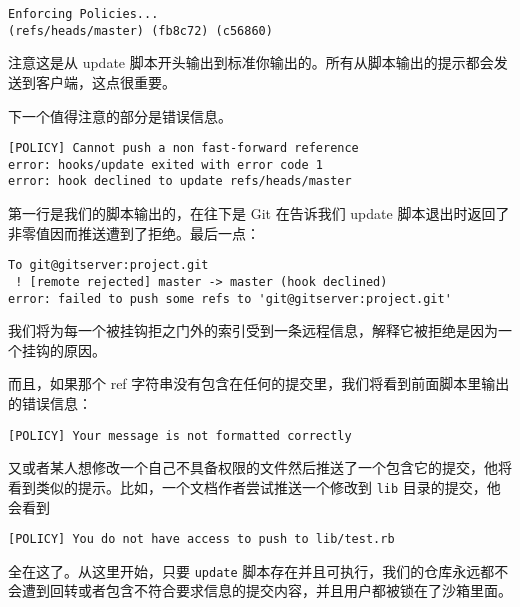 \documentclass[a4paper]{book}
\begin{document}
\begin{shaded}\begin{verbatim}
Enforcing Policies... 
(refs/heads/master) (fb8c72) (c56860)
\end{verbatim}\end{shaded}

注意这是从 update 脚本开头输出到标准你输出的。所有从脚本输出的提示都会发送到客户端，这点很重要。

下一个值得注意的部分是错误信息。

\begin{shaded}\begin{verbatim}
[POLICY] Cannot push a non fast-forward reference
error: hooks/update exited with error code 1
error: hook declined to update refs/heads/master
\end{verbatim}\end{shaded}

第一行是我们的脚本输出的，在往下是 Git 在告诉我们 update 脚本退出时返回了非零值因而推送遭到了拒绝。最后一点：

\begin{shaded}\begin{verbatim}
To git@gitserver:project.git
 ! [remote rejected] master -> master (hook declined)
error: failed to push some refs to 'git@gitserver:project.git'
\end{verbatim}\end{shaded}

我们将为每一个被挂钩拒之门外的索引受到一条远程信息，解释它被拒绝是因为一个挂钩的原因。

而且，如果那个 ref 字符串没有包含在任何的提交里，我们将看到前面脚本里输出的错误信息：

\begin{shaded}\begin{verbatim}
[POLICY] Your message is not formatted correctly
\end{verbatim}\end{shaded}

又或者某人想修改一个自己不具备权限的文件然后推送了一个包含它的提交，他将看到类似的提示。比如，一个文档作者尝试推送一个修改到 \texttt{lib} 目录的提交，他会看到

\begin{shaded}\begin{verbatim}
[POLICY] You do not have access to push to lib/test.rb
\end{verbatim}\end{shaded}

全在这了。从这里开始，只要 \texttt{update} 脚本存在并且可执行，我们的仓库永远都不会遭到回转或者包含不符合要求信息的提交内容，并且用户都被锁在了沙箱里面。
\end{document}
